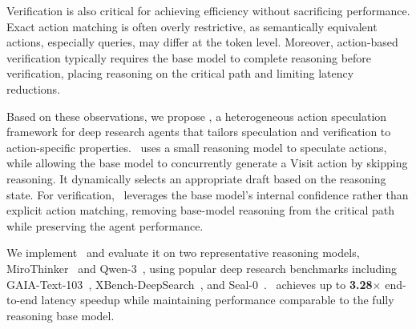 Verification is also critical for achieving efficiency without sacrificing performance.
Exact action matching is often overly restrictive, as semantically equivalent actions, especially queries, may differ at the token level.
Moreover, action-based verification typically requires the base model to complete reasoning before verification, placing reasoning on the critical path and limiting latency reductions.



Based on these observations, we propose \method, a heterogeneous action speculation framework for deep research agents that tailors speculation and verification to action-specific properties.
\method~uses a small reasoning model to speculate actions, while allowing the base model to concurrently generate a Visit action by skipping reasoning.
It dynamically selects an appropriate draft based on the reasoning state.
For verification, \method~leverages the base model's internal confidence rather than explicit action matching, removing base-model reasoning from the critical path while preserving the agent performance.


We implement \method~and evaluate it on two representative reasoning models, MiroThinker~\cite{team2025mirothinker} and Qwen-3~\cite{team2025tongyi}, using popular deep research benchmarks including GAIA-Text-103~\cite{wu2025webdancer}, XBench-DeepSearch~\cite{chen2025xbench}, and Seal-0~\cite{pham2025sealqa}.
\method~achieves up to \textbf{3.28}$\times$ end-to-end latency speedup while maintaining performance comparable to the fully reasoning base model.





